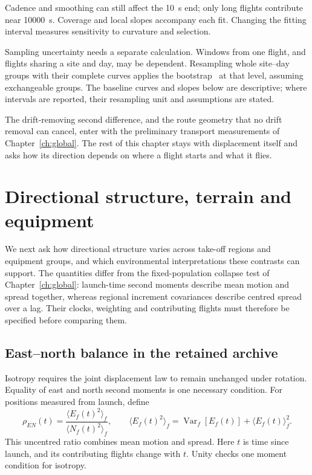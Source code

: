 Cadence and smoothing can still affect the \SI{10}{\second} end; only long flights
contribute near \SI{10000}{\second}. Coverage and local slopes accompany each fit.
Changing the fitting interval measures sensitivity to curvature and selection.

Sampling uncertainty needs a separate calculation. Windows from one flight, and
flights sharing a site and day, may be dependent. Resampling whole site--day groups
with their complete curves applies the bootstrap~\cite{efron1979} at that level,
assuming exchangeable groups. The baseline curves and slopes below are descriptive;
where intervals are reported, their resampling unit and assumptions are stated.


The drift-removing second difference, and the route geometry that no drift removal can
cancel, enter with the preliminary transport measurements of Chapter~\ref{ch:global}.
The rest of this chapter stays with displacement itself and asks how its direction
depends on where a flight starts and what it flies.

\FloatBarrier
\FloatBarrier
\endgroup

\section{Directional structure, terrain and equipment}
\label{sec:transport-axisroutes}
\label{sec:transport-anisotropy}
\label{sec:transport-environment}

We next ask how directional structure varies across take-off regions and equipment
groups, and which environmental interpretations these contrasts can support.
The quantities differ from the fixed-population collapse test of
Chapter~\ref{ch:global}: launch-time
second moments describe mean motion and spread together, whereas regional
increment covariances describe centred spread over a lag. Their clocks, weighting
and contributing flights must therefore be specified before comparing them.

\subsection{East--north balance in the retained archive}

Isotropy requires the joint displacement law to remain unchanged under rotation.
Equality of east and north second moments is one necessary condition. For positions
measured from launch, define
\begin{equation}
  \rho_{EN}(t)=\frac{\langle E_f(t)^2\rangle_f}{\langle N_f(t)^2\rangle_f},
  \qquad
  \langle E_f(t)^2\rangle_f
  =\operatorname{Var}_f[E_f(t)]+\langle E_f(t)\rangle_f^2.
  \label{eq:archive-directional-ratio}
\end{equation}
This uncentred ratio combines mean motion and spread. Here $t$ is time since
launch, and its contributing flights change with $t$. Unity checks one moment
condition for isotropy.

